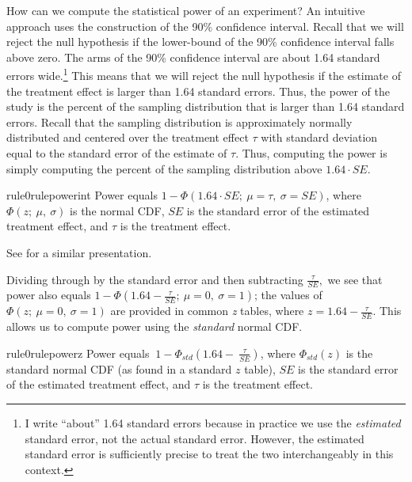 \documentclass[12pt]{article}
\begin{document}
How can we compute the statistical power of an experiment? 
An intuitive approach uses the construction of the 90\% confidence interval. 
Recall that we will reject the null hypothesis if the lower-bound of the 90\% confidence interval falls above zero. 
The arms of the 90\% confidence interval are about 1.64 standard errors wide.\footnote{
  I write ``about'' 1.64 standard errors because in practice we use the \emph{estimated} standard error, not the actual standard error. 
  However, the estimated standard error is sufficiently precise to treat
  the two interchangeably in this context.
  }
This means that we will reject the null hypothesis if the estimate of the treatment effect is larger than 1.64 standard errors. 
Thus, the power of the study is the percent of the sampling distribution that is larger than 1.64 standard errors. 
Recall that the sampling distribution is approximately normally distributed and centered over the treatment effect $\tau$ with standard deviation equal to the standard error of the estimate of $\tau$. 
Thus, computing the power is simply computing the percent of the sampling distribution above $1.64 \cdot SE$.



\begin{restatable}{rule0}{rulepowerint}
\label{rule:power-int}
Power equals $1 - \Phi(1.64 \cdot SE;\ \mu = \tau,\ \sigma = SE)$, where $\Phi(z;\ \mu,\ \sigma)$ is the normal CDF, $SE$ is the standard error of the estimated treatment effect, and $\tau$ is the treatment effect.
\end{restatable}

\noindent See \citet[92]{Gerber2012} for a similar presentation.

Dividing through by the standard error and then subtracting $\frac{\tau}{SE},$ we see that power also equals $1 - \Phi\left( 1.64 - \frac{\tau}{SE};\ \mu = 0,\ \sigma = 1 \right)$; the values of $\Phi\left(z;\ \mu = 0,\ \sigma = 1 \right)$ are provided in common \emph{z} tables, where $z = 1.64 - \frac{\tau}{SE}$. 
This allows us to compute power using the \emph{standard} normal CDF.

\begin{restatable}{rule0}{rulepowerz}
\label{rule:power-z}
Power equals $\ 1 - \Phi_{std}\left( 1.64 - \ \frac{\tau}{SE} \right)$, where $\Phi_{std}(z)$ is the standard normal CDF (as found in a standard $z$ table), $SE$ is the standard error of the estimated treatment effect, and $\tau$ is the treatment effect.
\end{restatable}
\end{document}
